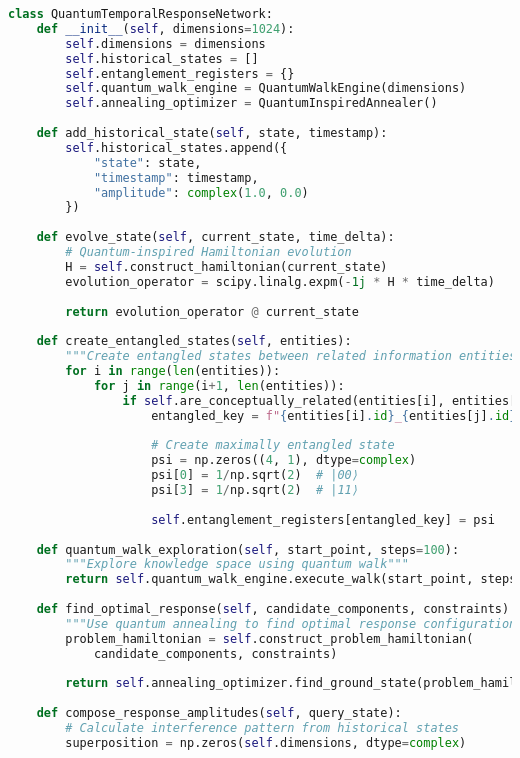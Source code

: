\documentclass[journal,onecolumn]{IEEEtran}
\begin{document}
\begin{lstlisting}[language=Python, caption=QITS Implementation Pseudocode]
class QuantumTemporalResponseNetwork:
    def __init__(self, dimensions=1024):
        self.dimensions = dimensions
        self.historical_states = []
        self.entanglement_registers = {}
        self.quantum_walk_engine = QuantumWalkEngine(dimensions)
        self.annealing_optimizer = QuantumInspiredAnnealer()
    
    def add_historical_state(self, state, timestamp):
        self.historical_states.append({
            "state": state,
            "timestamp": timestamp,
            "amplitude": complex(1.0, 0.0)
        })
    
    def evolve_state(self, current_state, time_delta):
        # Quantum-inspired Hamiltonian evolution
        H = self.construct_hamiltonian(current_state)
        evolution_operator = scipy.linalg.expm(-1j * H * time_delta)
        
        return evolution_operator @ current_state
    
    def create_entangled_states(self, entities):
        """Create entangled states between related information entities"""
        for i in range(len(entities)):
            for j in range(i+1, len(entities)):
                if self.are_conceptually_related(entities[i], entities[j]):
                    entangled_key = f"{entities[i].id}_{entities[j].id}"
                    
                    # Create maximally entangled state
                    psi = np.zeros((4, 1), dtype=complex)
                    psi[0] = 1/np.sqrt(2)  # |00⟩
                    psi[3] = 1/np.sqrt(2)  # |11⟩
                    
                    self.entanglement_registers[entangled_key] = psi
    
    def quantum_walk_exploration(self, start_point, steps=100):
        """Explore knowledge space using quantum walk"""
        return self.quantum_walk_engine.execute_walk(start_point, steps)
    
    def find_optimal_response(self, candidate_components, constraints):
        """Use quantum annealing to find optimal response configuration"""
        problem_hamiltonian = self.construct_problem_hamiltonian(
            candidate_components, constraints)
        
        return self.annealing_optimizer.find_ground_state(problem_hamiltonian)
    
    def compose_response_amplitudes(self, query_state):
        # Calculate interference pattern from historical states
        superposition = np.zeros(self.dimensions, dtype=complex)
        

\end{lstlisting}
\end{document}
